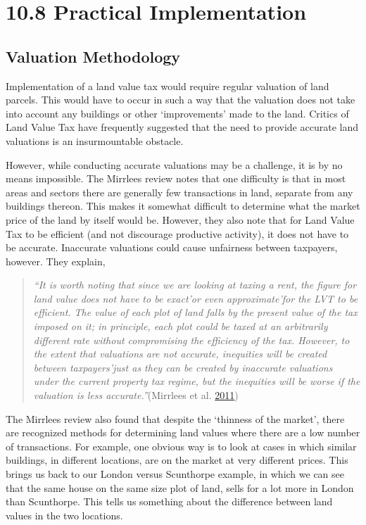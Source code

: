 \documentclass[]{tufte-handout}
\begin{document}
\hypertarget{practical-implementation}{%
\section{10.8 Practical Implementation}\label{practical-implementation}}

\hypertarget{valuation-methodology}{%
\subsection{Valuation Methodology}\label{valuation-methodology}}

Implementation of a land value tax would require regular valuation of
land parcels. This would have to occur in such a way that the valuation
does not take into account any buildings or other `improvements' made to
the land. Critics of Land Value Tax have frequently suggested that the
need to provide accurate land valuations is an insurmountable obstacle.

However, while conducting accurate valuations may be a challenge, it is
by no means impossible. The Mirrlees review notes that one difficulty is
that in most areas and sectors there are generally few transactions in
land, separate from any buildings thereon. This makes it somewhat
difficult to determine what the market price of the land by itself would
be. However, they also note that for Land Value Tax to be efficient (and
not discourage productive activity), it does not have to be accurate.
Inaccurate valuations could cause unfairness between taxpayers, however.
They explain,

\begin{quote}
\emph{``It is worth noting that since we are looking at taxing a rent,
the figure for land value does not have to be exact'or even
approximate'for the LVT to be efficient. The value of each plot of land
falls by the present value of the tax imposed on it; in principle, each
plot could be taxed at an arbitrarily different rate without
compromising the efficiency of the tax. However, to the extent that
valuations are not accurate, inequities will be created between
taxpayers'just as they can be created by inaccurate valuations under the
current property tax regime, but the inequities will be worse if the
valuation is less accurate.''}(Mirrlees et al.
\protect\hyperlink{ref-Mirrlees2011}{2011})
\end{quote}

The Mirrlees review also found that despite the `thinness of the
market', there are recognized methods for determining land values where
there are a low number of transactions. For example, one obvious way is
to look at cases in which similar buildings, in different locations, are
on the market at very different prices. This brings us back to our
London versus Scunthorpe example, in which we can see that the same
house on the same size plot of land, sells for a lot more in London than
Scunthorpe. This tells us something about the difference between land
values in the two locations.
\end{document}
